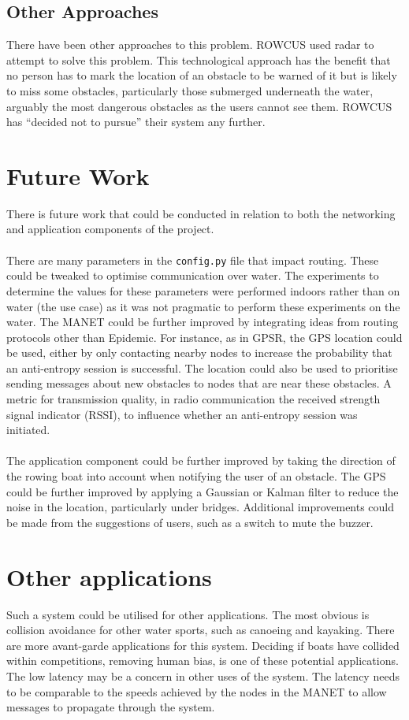 \documentclass[12pt,a4paper]{report}
\begin{document}
{\subsection{Other Approaches}
There have been other approaches to this problem. ROWCUS used radar to attempt to solve this problem. This technological approach has the benefit that no person has to mark the location of an obstacle to be warned of it but is likely to miss some obstacles, particularly those submerged underneath the water, arguably the most dangerous obstacles as the users cannot see them. ROWCUS has ``decided not to pursue'' their system any further. \\

\section{Future Work}
There is future work that could be conducted in relation to both the networking and application components of the project. \\ \\
There are many parameters in the \verb'config.py' file that impact routing. These could be tweaked to optimise communication over water. The experiments to determine the values for these parameters were performed indoors rather than on water (the use case) as it was not pragmatic to perform these experiments on the water.
The MANET could be further improved by integrating ideas from routing protocols other than Epidemic. For instance, as in GPSR, the GPS location could be used, either by only contacting nearby nodes to increase the probability that an anti-entropy session is successful. The location could also be used to prioritise sending messages about new obstacles to nodes that are near these obstacles.  A metric for transmission quality, in radio communication the received strength signal indicator (RSSI), to influence whether an anti-entropy session was initiated. \\ \\ 
The application component could be further improved by taking the direction of the rowing boat into account when notifying the user of an obstacle. The GPS could be further improved by applying a Gaussian or Kalman filter to reduce the noise in the location, particularly under bridges. Additional improvements could be made from the suggestions of users, such as a switch to mute the buzzer. \\

\section{Other applications}
Such a system could be utilised for other applications. The most obvious is collision avoidance for other water sports, such as canoeing and kayaking. There are more avant-garde applications for this system. Deciding if boats have collided within competitions, removing human bias, is one of these potential applications. The low latency may be a concern in other uses of the system. The latency needs to be comparable to the speeds achieved by the nodes in the MANET to allow messages to propagate through the system.

}
\end{document}
